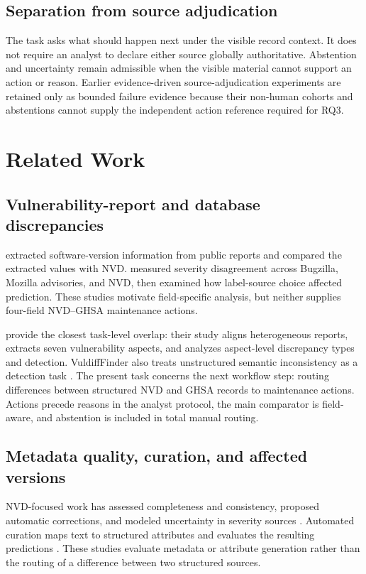 \documentclass[preprint,review,12pt,authoryear]{elsarticle}
\begin{document}
\subsection{Separation from source adjudication}

The task asks what should happen next under the visible record context. It does
not require an analyst to declare either source globally authoritative.
Abstention and uncertainty remain admissible when the visible material cannot
support an action or reason. Earlier evidence-driven source-adjudication
experiments are retained only as bounded failure evidence because their
non-human cohorts and abstentions cannot supply the independent action reference
required for RQ3.

\section{Related Work}
\label{sec:related}

\subsection{Vulnerability-report and database discrepancies}

\citet{Dong2019VIEM} extracted software-version information from public reports
and compared the extracted values with NVD. \citet{Croft2022Severity} measured
severity disagreement across Bugzilla, Mozilla advisories, and NVD, then
examined how label-source choice affected prediction. These studies motivate
field-specific analysis, but neither supplies four-field NVD--GHSA maintenance
actions.

\citet{Sun2023Aspect} provide the closest task-level overlap: their study aligns
heterogeneous reports, extracts seven vulnerability aspects, and analyzes
aspect-level discrepancy types and detection. VuldiffFinder also treats
unstructured semantic inconsistency as a detection task
\citep{Li2025VuldiffFinder}. The present task concerns the next workflow step:
routing differences between structured NVD and GHSA records to maintenance
actions. Actions precede reasons in the analyst protocol, the main comparator is
field-aware, and abstention is included in total manual routing.

\subsection{Metadata quality, curation, and affected versions}

NVD-focused work has assessed completeness and consistency, proposed automatic
corrections, and modeled uncertainty in severity sources
\citep{Anwar2022CleaningNVD,Johnson2018CVSS}. Automated curation maps text to
structured attributes and evaluates the resulting predictions
\citep{Okutan2023Curation}. These studies evaluate metadata or attribute
generation rather than the routing of a difference between two structured
sources.
\end{document}
